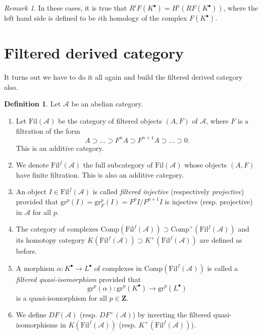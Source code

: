 \documentclass{stacks-project}
\theoremstyle{plain}
\theoremstyle{definition}
\newtheorem{definition}[subsection]{Definition}
\theoremstyle{remark}
\newtheorem{remark}[subsection]{Remark}
\numberwithin{equation}{subsection}
\begin{document}
\begin{remark}
\label{remark-cohomology-of-derived-functor}
In these cases, it is true that $R^iF(K^\bullet) = H^i(RF(K^\bullet))$, where
the left hand side is defined to be $i$th homology of the complex
$F(K^\bullet)$.
\end{remark}




\section{Filtered derived category}
\label{section-filtered-derived-category}

\noindent
It turns out we have to do it all again and build the filtered derived
category also.

\begin{definition}
\label{definition-filtered}
Let $\mathcal{A}$ be an abelian category.
\begin{enumerate}
\item Let $\text{Fil}(\mathcal{A})$ be the category of filtered objects
$(A, F)$ of $\mathcal{A}$, where $F$ is a filtration of the form
$$
A \supset \ldots \supset F^n A \supset F^{n+1}A \supset \ldots
\supset 0.
$$
This is an additive category.
\item We denote $\text{Fil}^f(\mathcal{A})$ the full
subcategory of $\text{Fil}(\mathcal{A})$ whose objects $(A, F)$ have finite
filtration. This is also an additive category.
\item An object $I \in \text{Fil}^f(\mathcal{A})$ is called
{\it filtered injective} (respectively {\it projective}) provided
that $\text{gr}^p(I) = \text{gr}_F^p(I) = F^pI/F^{p+1}I$ is injective
(resp. projective) in $\mathcal{A}$ for all $p$.
\item The category of complexes
$\text{Comp}(\text{Fil}^f(\mathcal{A})) \supset
\text{Comp}^+(\text{Fil}^f(\mathcal{A}))$
and its homotopy category
$K(\text{Fil}^f(\mathcal{A})) \supset K^+(\text{Fil}^f(\mathcal A))$
are defined as before.
\item A morphism $\alpha : K^\bullet \to L^\bullet$ of complexes in
$\text{Comp}(\text{Fil}^f(\mathcal{A}))$ is called a
{\it filtered quasi-isomorphism} provided that
$$
\text{gr}^p(\alpha): \text{gr}^p(K^\bullet) \to \text{gr}^p(L^\bullet)
$$
is a quasi-isomorphism for all $p \in \mathbf{Z}$.
\item We define $DF(\mathcal{A})$ (resp. $DF^+(\mathcal{A})$)
by inverting the filtered quasi-isomorphisms in
$K(\text{Fil}^f(\mathcal{A}))$ (resp. $K^+(\text{Fil}^f(\mathcal{A}))$).
\end{enumerate}
\end{definition}
\end{document}
